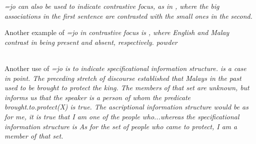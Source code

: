 

  
\em =jo \em can also be used to indicate contrastive focus, as in , where the big associations in the first sentence are contrasted with the small ones in the second.


Another example of \em =jo \em in contrastive focus is , where English and Malay contrast in being present and absent, respectively.
powder

\\ 

Another use of \em =jo \em is to indicate specificational information structure.  is a case in point. The preceding stretch of discourse established that Malays in the past used to be brought to protect the king. The members of that set are unknown, but  informs us that the speaker is a person of whom the predicate brought.to.protect(X) is true. The ascriptional information structure would be \em as for me, it is true that I am one of the people who...\em whereas the specificational information structure is \em As for the set of people who came to protect, I am a member of that set.\em

